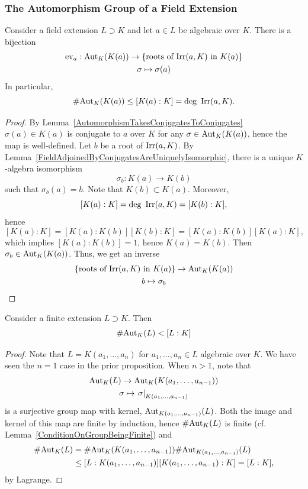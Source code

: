 \subsubsection{The Automorphism Group of a Field Extension}
\begin{proposition}
    Consider a field extension $L\supset K$ and let $a\in L$ be algebraic over $K$. There is a bijection 
    \begin{gather*}
        \mathrm{ev}_a : \mathrm{Aut}_K(K(a)) \rightarrow \{\text{roots of } \mathrm{Irr}(a,K) \text{ in } K(a)\}\\
        \sigma \mapsto \sigma(a)
    \end{gather*}
    In particular, 
    $$
        \# \mathrm{Aut}_K(K(a)) \leq [K(a) : K] = \deg \ \mathrm{Irr}(a,K).
    $$
\end{proposition}
\begin{proof}
    By Lemma~\ref{AutomorphismTakesConjugatesToConjugates}
    $\sigma(a)\in K(a)$ is conjugate to $a$ over $K$ for any 
    $\sigma\in \mathrm{Aut}_K(K(a))$, hence the map is well-defined. Let
    $b$ be a root of $\mathrm{Irr}(a,K)$. 
    By Lemma~\ref{FieldAdjoinedByConjugatesAreUniquelyIsomorphic}, there is a unique $K$-algebra isomorphism 
    $$
        \sigma_b : K(a)\rightarrow K(b)
    $$
    such that $\sigma_b(a) = b$. Note that $K(b)\subset K(a)$. Moreover, 
    $$
        [K(a) : K] = \deg \ \mathrm{Irr}(a,K) = [K(b) : K],
    $$
    hence 
    $$
        [K(a) : K] = [K(a) : K(b)] [K(b) : K] = [K(a) : K(b)][K(a):K],
    $$
    which implies $[K(a) : K(b)] = 1$, hence $K(a)=K(b)$. Then $\sigma_b \in \mathrm{Aut}_K(K(a))$. Thus, we get an inverse
    \begin{gather*}
        \{\text{roots of } \mathrm{Irr}(a,K) \text{ in } K(a)\} \rightarrow \mathrm{Aut}_K(K(a))\\
        b \mapsto \sigma_b
    \end{gather*} 
\end{proof}

\begin{lemma}
    Consider a finite extension $L\supset K$. Then 
    $$
        \#\mathrm{Aut}_K(L) < [L : K]
    $$
\end{lemma}
\begin{proof}
    Note that $L = K(a_1,\dots,a_n)$ for $a_1,\dots,a_n\in L$ algebraic over $K$. We have seen the $n=1$ case in the prior proposition. When $n>1$, note that 
    \begin{gather*}
        \mathrm{Aut}_K(L) \rightarrow \mathrm{Aut}_K(K(a_1,\dots,a_{n-1}))\\
        \sigma \mapsto \left. \sigma\right|_{K(a_1,\dots,a_{n-1})}
    \end{gather*}
    is a surjective group map with kernel, $\mathrm{Aut}_{K(a_1,\dots,a_{n-1})}(L)$. Both the image and kernel of this map are finite by induction, hence $\#\mathrm{Aut}_K(L)$ is finite (cf. Lemma~\ref{ConditionOnGroupBeingFinite}) and  
    \begin{align*}
        \# \mathrm{Aut}_K(L) &= \#\mathrm{Aut}_K(K(a_1,\dots,a_{n-1}))\#\mathrm{Aut}_{K(a_1,\dots,a_{n-1})}(L)\\
        & \leq [L:K(a_1,\dots,a_{n-1})][K(a_1,\dots,a_{n-1}):K] = [L:K],
    \end{align*}
    by Lagrange. 
\end{proof}

